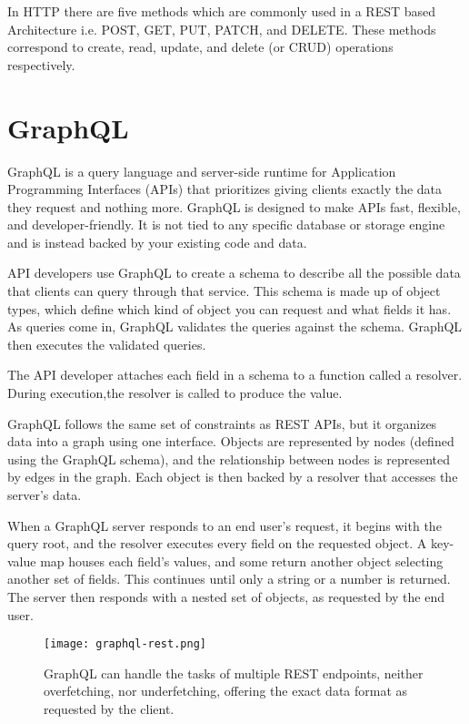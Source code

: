 In HTTP there are five methods which are commonly used in a REST based Architecture 
i.e. POST, GET, PUT, PATCH, and DELETE. These methods correspond to create, read, 
update, and delete (or CRUD) operations respectively.~\cite{GeeksRestAPI}

\section{GraphQL}

GraphQL is a query language and server-side runtime for Application Programming Interfaces (APIs) 
that prioritizes giving clients exactly the data they request and nothing more. 
GraphQL is designed to make APIs fast, flexible, and developer-friendly. It is not tied 
to any specific database or storage engine and is instead backed by your existing code and data.

API developers use GraphQL to create a schema to describe all the possible data that clients can query 
through that service. This schema is made up of object types, which define which kind of object you can 
request and what fields it has. As queries come in, GraphQL validates the queries against the schema. 
GraphQL then executes the validated queries.

The API developer attaches each field in a schema to a function called a resolver. 
During execution,the resolver is called to produce the value.~\cite{WhatisGraphQL}

GraphQL follows the same set of constraints as REST APIs, but it organizes data into a 
graph using one interface. Objects are represented by nodes (defined using the GraphQL schema), 
and the relationship between nodes is represented by edges in the graph. Each object is then backed 
by a resolver that accesses the server’s data.

When a GraphQL server responds to an end user’s request, it begins with the query root,
and the resolver executes every field on the requested object. A key-value map houses each field’s
values, and some return another object selecting another set of fields. This continues until only a 
string or a number is returned. The server then responds with a nested set of objects, as requested by 
the end user.~\cite{RubrikGraphQL}

\begin{figure}
    \begin{center}
        \texttt{[image: graphql-rest.png]}
    \end{center}
    \caption{GraphQL can handle the tasks of multiple REST endpoints, 
    neither overfetching, nor underfetching,
    offering the exact data format as requested by the client.~\cite{GraphQLvsREST}}
    \label{fig:graphql}
\end{figure}
  
